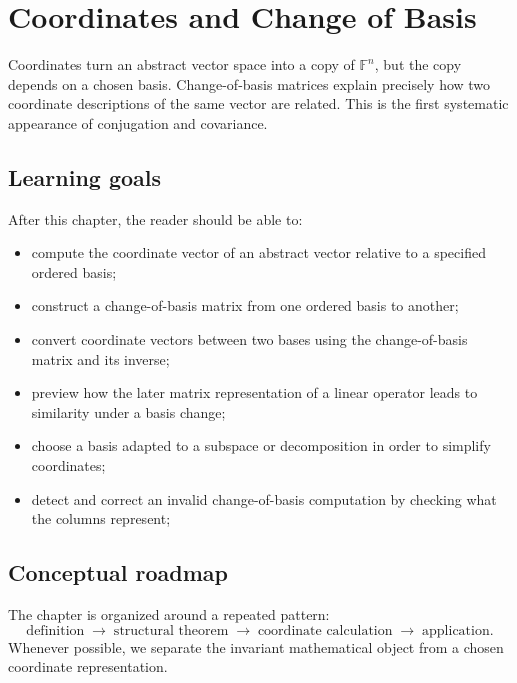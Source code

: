 \chapter{Coordinates and Change of Basis}
\label{ch:i04-coordinates-and-change-of-basis}

Coordinates turn an abstract vector space into a copy of $\mathbb F^n$, but the copy depends on a chosen basis. Change-of-basis matrices explain precisely how two coordinate descriptions of the same vector are related. This is the first systematic appearance of conjugation and covariance.

\section*{Learning goals}
After this chapter, the reader should be able to:
\begin{itemize}
\item compute the coordinate vector of an abstract vector relative to a specified ordered basis;
\item construct a change-of-basis matrix from one ordered basis to another;
\item convert coordinate vectors between two bases using the change-of-basis matrix and its inverse;
\item preview how the later matrix representation of a linear operator leads to similarity under a basis change;
\item choose a basis adapted to a subspace or decomposition in order to simplify coordinates;
\item detect and correct an invalid change-of-basis computation by checking what the columns represent;
\end{itemize}
\section*{Conceptual roadmap}
The chapter is organized around a repeated pattern:
\[
\boxed{\text{definition}\;\longrightarrow\;\text{structural theorem}\;\longrightarrow\;\text{coordinate calculation}\;\longrightarrow\;\text{application}.}
\]
Whenever possible, we separate the invariant mathematical object from a chosen coordinate representation.


